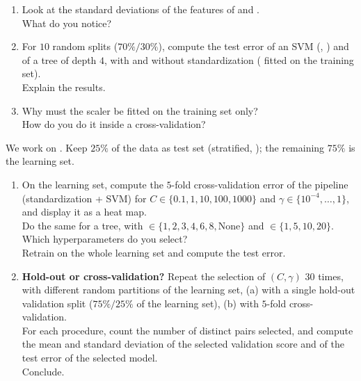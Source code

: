 \documentclass[a4paper,11pt]{article}
\begin{document}
\label{p1:norm}

\begin{enumerate}
\item Look at the standard deviations of the features of  and .\\
      What do you notice?
\item For $10$ random splits ($70\%/30\%$), compute the test error of an SVM (, ) and of a
      tree of depth $4$, with and without standardization ( fitted on the training set).\\
      Explain the
      results.
\item Why must the scaler be fitted on the training set only?\\
      How do you do it inside a cross-validation?
\end{enumerate}

\label{p1:cv}

We work on . Keep $25\%$ of the data as test set (stratified, ); the remaining
$75\%$ is the learning set.

\begin{enumerate}
\item On the learning set, compute the $5$-fold cross-validation error of the pipeline (standardization + SVM) for
      $C\in\{0.1,1,10,100,1000\}$ and $\gamma\in\{10^{-4},\dots,1\}$, and display it as a heat map.\\
      Do the same for a
      tree, with $\in\{1,2,3,4,6,8,\text{None}\}$ and $\in\{1,5,10,20\}$.\\
      Which hyperparameters do you select?\\
      Retrain on the whole learning set and compute the test error.
\item \textbf{Hold-out or cross-validation?} Repeat the selection of $(C,\gamma)$ $30$ times, with different random
      partitions of the learning set, (a) with a single hold-out validation split ($75\%/25\%$ of the learning set),
      (b) with $5$-fold cross-validation.\\
      For each procedure, count the number of distinct pairs selected, and compute
      the mean and standard deviation of the selected validation score and of the test error of the selected model.\\
      Conclude.
\end{enumerate}
\end{document}
